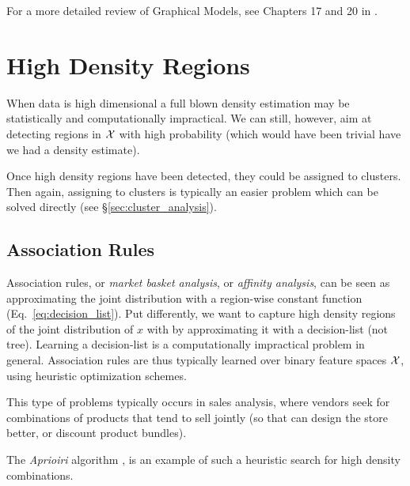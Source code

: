 For a more detailed review of Graphical Models, see Chapters 17 and 20 in \cite{wasserman_all_2004}. 






\section{High Density Regions}
\label{sec:high_density}

When data is high dimensional a full blown density estimation may be statistically and computationally impractical.
We can still, however, aim at detecting regions in $\mathcal{X}$ with high probability (which would have been trivial have we had a density estimate).

Once high density regions have been detected, they could be assigned to clusters. Then again, assigning to clusters is typically an easier problem which can be solved directly (see \S\ref{sec:cluster_analysis}).



\subsection{Association Rules}
\label{sec:association}
Association rules, or \emph{market basket analysis}, or \emph{affinity analysis}, can be seen as approximating the joint distribution with a region-wise constant function (Eq.~\ref{eq:decision_list}).
Put differently, we want to capture high density regions of the joint distribution of $x$ with by approximating it with a decision-list (not tree).
Learning a decision-list is a computationally impractical problem in general. Association rules are thus typically learned over binary feature spaces $\mathcal{X}$, using heuristic optimization schemes.

This type of problems typically occurs in sales analysis, where vendors seek for combinations of products that tend to sell jointly (so that can design the store better, or discount product bundles).

The \emph{Aprioiri} algorithm \cite{agraval_fast_1994}, is an example of such a heuristic search for high density combinations.


















